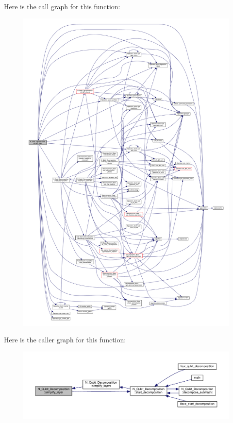 Here is the call graph for this function\+:
\nopagebreak
\begin{figure}[H]
\begin{center}
\leavevmode
\includegraphics[width=350pt]{class_n___qubit___decomposition_a13453d7704869cfc8536767c2db4518d_cgraph}
\end{center}
\end{figure}




Here is the caller graph for this function\+:
\nopagebreak
\begin{figure}[H]
\begin{center}
\leavevmode
\includegraphics[width=350pt]{class_n___qubit___decomposition_a13453d7704869cfc8536767c2db4518d_icgraph}
\end{center}
\end{figure}


